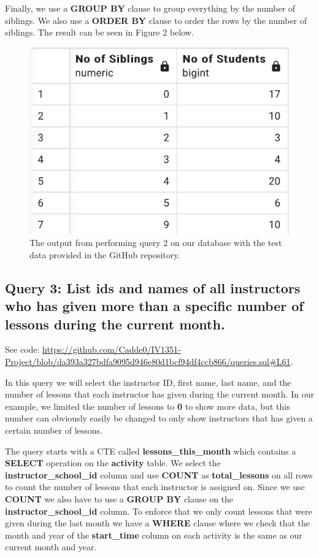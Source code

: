 \documentclass[a4paper]{scrartcl}
\begin{document}
Finally, we use a \textbf{GROUP BY} clause to group everything by the number of siblings. We also use a \textbf{ORDER BY} clause to order the rows by the number of siblings. The result can be seen in Figure 2 below.

\begin{figure}[H]
    \begin{center}
      \includegraphics[scale=0.6]{query2_output.png}
      \caption{The output from performing query 2 on our database with the test data provided in the GitHub repository.}
      \label{fig:diag}
    \end{center}
  \end{figure}


\subsection{Query 3: List ids and names of all instructors who has given more than a specific number of lessons during the current month.}
See code: \url{https://github.com/Cadde0/IV1351-Project/blob/da393a327bdfa9095d946e80d1bcf94df4ccb866/queries.sql#L61}.

In this query we will select the instructor ID, first name, last name, and the number of lessons that each instructor has given during the current month. In our example, we limited the number of lessons to \textbf{0} to show more data, but this number can obviously easily be changed to only show instructors that has given a certain number of lessons.

The query starts with a CTE called \textbf{lessons\_this\_month} which contains a \textbf{SELECT} operation on the \textbf{activity} table. We select the \textbf{instructor\_school\_id} column and use \textbf{COUNT} as \textbf{total\_lessons} on all rows to count the number of lessons that each instructor is assigned on. Since we use \textbf{COUNT} we also have to use a \textbf{GROUP BY} clause on the \textbf{instructor\_school\_id} column. To enforce that we only count lessons that were given during the last month we have a \textbf{WHERE} clause where we check that the month and year of the \textbf{start\_time} column on each activity is the same as our current month and year.
\end{document}
